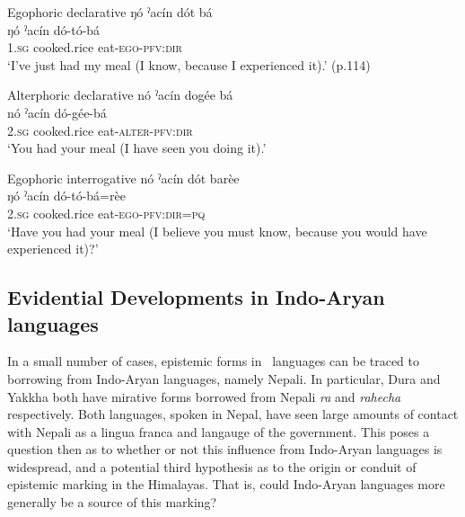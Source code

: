 \begin{exe}\label{e:History:Galo}
    \ex Egophoric declarative
    \glll ŋó ˀacín dót bá \\
    ŋó ˀacín dó-tó-bá \\
    1.\textsc{sg} cooked.rice eat-\textsc{ego-pfv:dir} \\
    \glt `I've just had my meal (I know, because I experienced it).' (p.114)

    \ex Alterphoric declarative
    \glll nó ˀacín dogée bá \\
    nó ˀacín dó-gée-bá \\
    2.\textsc{sg} cooked.rice eat-\textsc{alter-pfv:dir} \\
    \glt `You had your meal (I have seen you doing it).'

    \ex Egophoric interrogative
    \glll nó ˀacín dót barèe \\
    ŋó ˀacín dó-tó-bá=rèe \\
    2.\textsc{sg} cooked.rice eat-\textsc{ego-pfv:dir=pq} \\
    \glt `Have you had your meal (I believe you must know, because you would have experienced it)?'
    \cite{Post2013}
\end{exe}


\subsection{Evidential Developments in Indo-Aryan languages}
In a small number of cases, epistemic forms in \lfam\ languages can be traced to borrowing from Indo-Aryan languages, namely Nepali. In particular, Dura \cite[Internal Isolate: Nepal,][279]{Schorer2016} and Yakkha \cite[Kiranti: Nepal,][520]{Schackow2015} both have mirative forms borrowed from Nepali \textit{ra} and \textit{rahecha} respectively. Both languages, spoken in Nepal, have seen large amounts of contact with Nepali as a lingua franca and langauge of the government. This poses a question then as to whether or not this influence from Indo-Aryan languages is widespread, and a potential third hypothesis as to the origin or conduit of epistemic marking in the Himalayas. That is, could Indo-Aryan languages more generally be a source of this marking?

